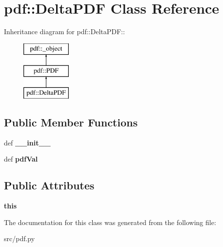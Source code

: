 \hypertarget{classpdf_1_1DeltaPDF}{
\section{pdf::DeltaPDF Class Reference}
\label{dc/d18/classpdf_1_1DeltaPDF}
}
Inheritance diagram for pdf::DeltaPDF::\begin{figure}[H]
\begin{center}
\leavevmode
\includegraphics[height=3cm]{dc/d18/classpdf_1_1DeltaPDF}
\end{center}
\end{figure}
\subsection*{Public Member Functions}
\begin{DoxyCompactItemize}
\item 
\hypertarget{classpdf_1_1DeltaPDF_a6fdc3ea1145460c7872f078ae4c53f47}{
def {\bfseries \_\-\_\-init\_\-\_\-}}
\label{dc/d18/classpdf_1_1DeltaPDF_a6fdc3ea1145460c7872f078ae4c53f47}

\item 
\hypertarget{classpdf_1_1DeltaPDF_a39f58564645df6ada5bdfa96bdea11c9}{
def {\bfseries pdfVal}}
\label{dc/d18/classpdf_1_1DeltaPDF_a39f58564645df6ada5bdfa96bdea11c9}

\end{DoxyCompactItemize}
\subsection*{Public Attributes}
\begin{DoxyCompactItemize}
\item 
\hypertarget{classpdf_1_1DeltaPDF_a5060ddf377ac837c54c16a4f56bd10a6}{
{\bfseries this}}
\label{dc/d18/classpdf_1_1DeltaPDF_a5060ddf377ac837c54c16a4f56bd10a6}

\end{DoxyCompactItemize}


The documentation for this class was generated from the following file:\begin{DoxyCompactItemize}
\item 
src/pdf.py\end{DoxyCompactItemize}

